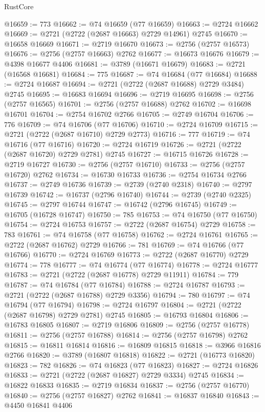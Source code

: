 \begin{lexlean}{RustCore}
\begin{coremodule}
@16659 := 773
@16662 := @74 @16659 (@77 @16659)
@16663 := @2724 @16662
@16669 := @2721 (@2722 (@2687 @16663) @2729 @14961) @2745
@16670 := @16658 @16669
@16671 := @2719 @16670
@16673 := @2756 (@2757 @16573)
@16676 := @2756 (@2757 @16663) @2762
@16677 := @16673 @16676
@16679 := @4398 @16677 @4406
@16681 := @3789 (@16671 @16679)
@16683 := @2721 (@16568 @16681)
@16684 := 775
@16687 := @74 @16684 (@77 @16684)
@16688 := @2724 @16687
@16694 := @2721 (@2722 (@2687 @16688) @2729 @3484) @2745
@16695 := @16683 @16694
@16696 := @2719 @16695
@16698 := @2756 (@2757 @16565)
@16701 := @2756 (@2757 @16688) @2762
@16702 := @16698 @16701
@16704 := @2754 @16702 @2766
@16705 := @2749 @16704
@16706 := 776
@16709 := @74 @16706 (@77 @16706)
@16710 := @2724 @16709
@16715 := @2721 (@2722 (@2687 @16710) @2729 @2773)
@16716 := 777
@16719 := @74 @16716 (@77 @16716)
@16720 := @2724 @16719
@16726 := @2721 (@2722 (@2687 @16720) @2729 @2781) @2745
@16727 := @16715 @16726
@16728 := @2719 @16727
@16730 := @2756 (@2757 @16710)
@16733 := @2756 (@2757 @16720) @2762
@16734 := @16730 @16733
@16736 := @2754 @16734 @2766
@16737 := @2749 @16736
@16739 := @2739 (@2740 @2318)
@16740 := @2797 @16739
@16742 := @16737 (@2796 @16740)
@16744 := @2739 (@2740 @2325)
@16745 := @2797 @16744
@16747 := @16742 (@2796 @16745)
@16749 := @16705 (@16728 @16747)
@16750 := 785
@16753 := @74 @16750 (@77 @16750)
@16754 := @2724 @16753
@16757 := @2722 (@2687 @16754) @2729
@16758 := 783
@16761 := @74 @16758 (@77 @16758)
@16762 := @2724 @16761
@16765 := @2722 (@2687 @16762) @2729
@16766 := 781
@16769 := @74 @16766 (@77 @16766)
@16770 := @2724 @16769
@16773 := @2722 (@2687 @16770) @2729
@16774 := 778
@16777 := @74 @16774 (@77 @16774)
@16778 := @2724 @16777
@16783 := @2721 (@2722 (@2687 @16778) @2729 @11911)
@16784 := 779
@16787 := @74 @16784 (@77 @16784)
@16788 := @2724 @16787
@16793 := @2721 (@2722 (@2687 @16788) @2729 @3356)
@16794 := 780
@16797 := @74 @16794 (@77 @16794)
@16798 := @2724 @16797
@16804 := @2721 (@2722 (@2687 @16798) @2729 @2781) @2745
@16805 := @16793 @16804
@16806 := @16783 @16805
@16807 := @2719 @16806
@16809 := @2756 (@2757 @16778)
@16811 := @2756 (@2757 @16788)
@16814 := @2756 (@2757 @16798) @2762
@16815 := @16811 @16814
@16816 := @16809 @16815
@16818 := @3966 @16816 @2766
@16820 := @3789 (@16807 @16818)
@16822 := @2721 (@16773 @16820)
@16823 := 782
@16826 := @74 @16823 (@77 @16823)
@16827 := @2724 @16826
@16833 := @2721 (@2722 (@2687 @16827) @2729 @3334) @2745
@16834 := @16822 @16833
@16835 := @2719 @16834
@16837 := @2756 (@2757 @16770)
@16840 := @2756 (@2757 @16827) @2762
@16841 := @16837 @16840
@16843 := @4450 @16841 @4406

\end{coremodule}
\end{lexlean}
